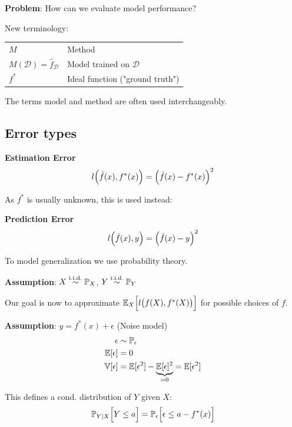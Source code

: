 \textbf{Problem}: How can we evaluate model performance?


New terminology:

\begin{tabular}{ll}
    $M$                                         & Method    \\
    $M(\mathcal{D}) = \hat{f}_\mathcal{D}$      & Model trained on $\mathcal{D}$ \\
    $f^*$                                       & Ideal function ("ground truth")
\end{tabular}

{\footnotesize
    \remark The terms model and method are often used interchangeably.
}

\subsection{Error types}

 \textbf{Estimation Error}\\
$$
    l\Bigl( \hat{f}(x), f^*(x) \Bigr) = \Bigl( \hat{f}(x)-f^*(x) \Bigr)^2
$$

As $f^*$ is usually unknown, this is used instead:

 \textbf{Prediction Error}\\
$$
    l\Bigl(\hat{f}(x),y\Bigr) = \Bigl(\hat{f}(x) - y\Bigr)^2
$$

To model generalization we use probability theory.

\textbf{Assumption}: $X \overset{\text{i.i.d.}}{\sim} \P_X$, $Y \overset{\text{i.i.d.}}{\sim} \P_Y$

Our goal is now to approximate $\E_X\Bigl[ l\bigl( f(X), f^*(X) \bigr) \Bigr]$ for possible choices of $f$.

\textbf{Assumption}: $y = f^*(x) + \epsilon$ (Noise model)
\begin{align*}
    \epsilon        &\sim \P_\epsilon \\
    \E[\epsilon]    &= 0 \\
    \V[\epsilon]    &= \E[\epsilon^2] - \underbrace{\E[\epsilon]^2}_{=0} = \E[\epsilon^2]
\end{align*}

This defines a cond. distribution of $Y$ given $X$:
$$
    \P_{Y|X}\Bigl[ Y \leq a \Bigr] = \P_\epsilon\Bigl[ \epsilon \leq a - f^*(x) \Bigr]
$$


